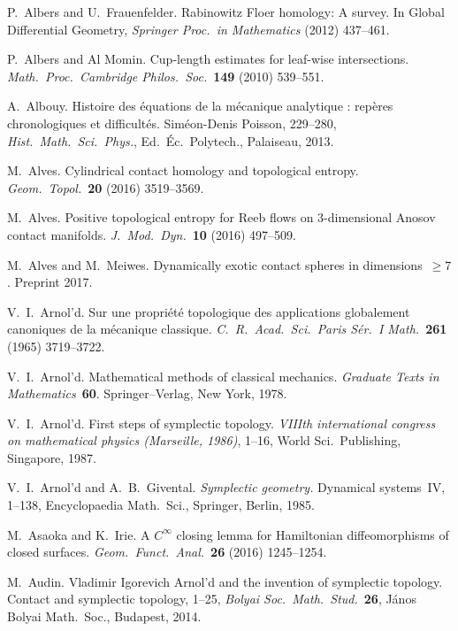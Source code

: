 \documentclass[12pt,twoside]{amsart}
\theoremstyle{plain}
\numberwithin{figure}{section}
\numberwithin{equation}{section}
\begin{document}
\begin{thebibliography}{999}
P.~Albers and U.~Frauenfelder.
Rabinowitz Floer homology: A survey.
In Global Differential Geometry, 
{\it Springer Proc.\ in Mathematics} (2012) 437--461.

P.\ Albers and Al Momin.
Cup-length estimates for leaf-wise intersections. 
{\it Math.\ Proc.\ Cambridge Philos.\ Soc.}~{\bf 149} (2010) 539--551.

A.\ Albouy.
Histoire des \'equations de la m\'ecanique analytique : rep\`eres chronologiques et difficult\'es. 
Sim\'eon-Denis Poisson, 229--280, 
{\it Hist.\ Math.\ Sci.\ Phys.}, Ed.\ \'Ec.\ Polytech., Palaiseau, 2013.

M.\ Alves.
Cylindrical contact homology and topological entropy.
{\it Geom.\ Topol.}~{\bf 20} (2016) 3519--3569.

M.\ Alves.
Positive topological entropy for Reeb flows on $3$-dimensional Anosov contact manifolds. 
{\it J.\ Mod.\ Dyn.}~{\bf 10} (2016) 497--509.

M.\ Alves and M.\ Meiwes.
Dynamically exotic contact spheres in dimensions~$\geqslant 7$.
Preprint 2017.


V.\ I.\ Arnol'd.
Sur une propri\'et\'e topologique des applications globalement canoniques de la m\'ecanique classique.
{\it C.\ R.\ Acad.\ Sci.\ Paris S\'er.\ I Math.}~{\bf 261} (1965) 3719--3722.

V.\ I.\ Arnol'd.
Mathematical methods of classical mechanics. 
{\it Graduate Texts in Mathematics}~{\bf 60}. 
Springer--Verlag, New York, 1978.

V.\ I.\ Arnol'd.
First steps of symplectic topology. 
{\it VIIIth international congress on mathematical physics (Marseille, 1986)}, 
1--16, World Sci.\ Publishing, Singapore, 1987.

V.\ I.\ Arnol'd and A.\ B.\ Givental.
{\it Symplectic geometry.} 
Dynamical systems~IV, 1--138, Encyclopaedia Math.\ Sci., 
Springer, Berlin, 1985. 

M.\ Asaoka and K.\ Irie.
A $C^\infty$ closing lemma for Hamiltonian diffeomorphisms of closed surfaces. 
{\it Geom.\ Funct.\ Anal.}~{\bf 26} (2016) 1245--1254.

M.\ Audin.
Vladimir Igorevich Arnol'd and the invention of symplectic topology. 
Contact and symplectic topology, 1–25, 
{\it Bolyai Soc.\ Math.\ Stud.}~{\bf 26}, J\'anos Bolyai Math.\ Soc., Budapest, 2014.


\end{thebibliography}
\end{document}
